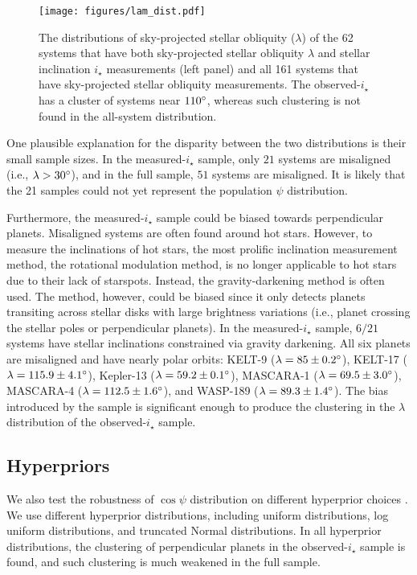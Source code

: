 \documentclass[twocolumn,times]{aastex631}
\newcommand{\numistar}{62\xspace}
\newcommand{\numall}{161\xspace}
\begin{document}
\begin{figure*}[ht!]
    \begin{centering}
        \texttt{[image: figures/lam\_dist.pdf]}
        \caption{The distributions of sky-projected stellar obliquity ($\lambda$) of the \numistar systems that have both sky-projected stellar obliquity $\lambda$ and stellar inclination $i_\star$ measurements (left panel) and all \numall systems that have sky-projected stellar obliquity measurements. The observed-$i_\star$ has a cluster of systems near $110\mbox{$^\circ$}$, whereas such clustering is not found in the all-system distribution.}
        \label{fig:lam_dist}
    \end{centering}
\end{figure*}

One plausible explanation for the disparity between the two distributions is their small sample sizes. In the measured-$i_\star$ sample, only $21$ systems are misaligned  (i.e., $\lambda > 30\mbox{$^\circ$}$), and in the full sample, $51$ systems are misaligned. It is likely that the 21 samples could not yet represent the population $\psi$ distribution. 

Furthermore, the measured-$i_\star$ sample could be biased towards perpendicular planets. Misaligned systems are often found around hot stars. However, to measure the inclinations of hot stars, the most prolific inclination measurement method, the rotational modulation method, is no longer applicable to hot stars due to their lack of starspots. Instead, the gravity-darkening method is often used. The method, however, could be biased since it only detects planets transiting across stellar disks with large brightness variations (i.e., planet crossing the stellar poles or perpendicular planets). In the measured-$i_\star$ sample, $6/21$ systems have stellar inclinations constrained via gravity darkening. All six planets are misaligned and have nearly polar orbits: 
KELT-9 ($\lambda = 85 \pm 0.2\mbox{$^\circ$}$),
KELT-17 ($\lambda = 115.9 \pm 4.1 \mbox{$^\circ$}$), 
Kepler-13 ($\lambda = 59.2 \pm 0.1 \mbox{$^\circ$}$), 
MASCARA-1 ($\lambda = 69.5 \pm 3.0 \mbox{$^\circ$}$),
MASCARA-4 ($\lambda = 112.5 \pm 1.6 \mbox{$^\circ$}$), 
and WASP-189 ($\lambda = 89.3 \pm 1.4 \mbox{$^\circ$}$).
The bias introduced by the sample is significant enough to produce the clustering in the $\lambda$ distribution of the observed-$i_\star$ sample.

\subsection{Hyperpriors}
We also test the robustness of $\cos{\psi}$ distribution on different hyperprior choices \citep[see a nice summary in][]{Nagpal22}. We use different hyperprior distributions, including uniform distributions, log uniform distributions, and truncated Normal distributions. In all hyperprior distributions, the clustering of perpendicular planets in the observed-$i_\star$ sample is found, and such clustering is much weakened in the full sample.
\end{document}
